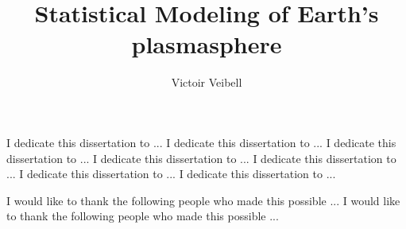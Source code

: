 \documentclass[11 pt]{report}
\begin{document}
\title{Statistical Modeling of Earth's plasmasphere}
\author{Victoir Veibell}












\signaturepage

\titlepage

\copyrightpage


\dedicationpage

\noindent I dedicate this dissertation to ...
I dedicate this dissertation to ...
I dedicate this dissertation to ...
I dedicate this dissertation to ...
I dedicate this dissertation to ...
I dedicate this dissertation to ...
I dedicate this dissertation to ...


\acknowledgementspage

\noindent I would like to thank the following people who made this possible ...
I would like to thank the following people who made this possible ...
\end{document}
